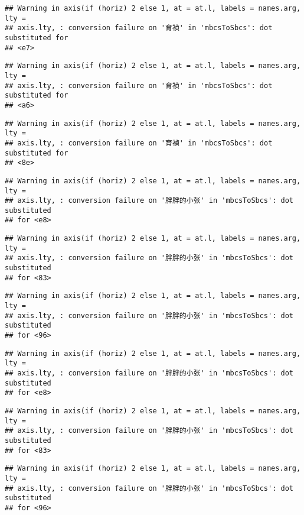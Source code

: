 \documentclass[
]{article}
\begin{document}
\begin{verbatim}
## Warning in axis(if (horiz) 2 else 1, at = at.l, labels = names.arg, lty =
## axis.lty, : conversion failure on '育禎' in 'mbcsToSbcs': dot substituted for
## <e7>
\end{verbatim}

\begin{verbatim}
## Warning in axis(if (horiz) 2 else 1, at = at.l, labels = names.arg, lty =
## axis.lty, : conversion failure on '育禎' in 'mbcsToSbcs': dot substituted for
## <a6>
\end{verbatim}

\begin{verbatim}
## Warning in axis(if (horiz) 2 else 1, at = at.l, labels = names.arg, lty =
## axis.lty, : conversion failure on '育禎' in 'mbcsToSbcs': dot substituted for
## <8e>
\end{verbatim}

\begin{verbatim}
## Warning in axis(if (horiz) 2 else 1, at = at.l, labels = names.arg, lty =
## axis.lty, : conversion failure on '胖胖的小张' in 'mbcsToSbcs': dot substituted
## for <e8>
\end{verbatim}

\begin{verbatim}
## Warning in axis(if (horiz) 2 else 1, at = at.l, labels = names.arg, lty =
## axis.lty, : conversion failure on '胖胖的小张' in 'mbcsToSbcs': dot substituted
## for <83>
\end{verbatim}

\begin{verbatim}
## Warning in axis(if (horiz) 2 else 1, at = at.l, labels = names.arg, lty =
## axis.lty, : conversion failure on '胖胖的小张' in 'mbcsToSbcs': dot substituted
## for <96>
\end{verbatim}

\begin{verbatim}
## Warning in axis(if (horiz) 2 else 1, at = at.l, labels = names.arg, lty =
## axis.lty, : conversion failure on '胖胖的小张' in 'mbcsToSbcs': dot substituted
## for <e8>
\end{verbatim}

\begin{verbatim}
## Warning in axis(if (horiz) 2 else 1, at = at.l, labels = names.arg, lty =
## axis.lty, : conversion failure on '胖胖的小张' in 'mbcsToSbcs': dot substituted
## for <83>
\end{verbatim}

\begin{verbatim}
## Warning in axis(if (horiz) 2 else 1, at = at.l, labels = names.arg, lty =
## axis.lty, : conversion failure on '胖胖的小张' in 'mbcsToSbcs': dot substituted
## for <96>
\end{verbatim}
\end{document}
